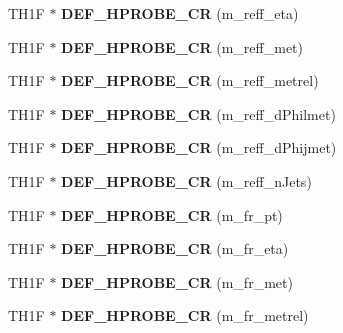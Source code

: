 \begin{DoxyCompactItemize}
\item 
\hypertarget{classHistos__Fake_a42e0ed3e92796cb4f5d49ed05856e556}{
TH1F $\ast$ {\bfseries DEF\_\-HPROBE\_\-CR} (m\_\-reff\_\-eta)}
\label{classHistos__Fake_a42e0ed3e92796cb4f5d49ed05856e556}

\item 
\hypertarget{classHistos__Fake_a049fd62ffe785865d7ad3dc3d92a0fd5}{
TH1F $\ast$ {\bfseries DEF\_\-HPROBE\_\-CR} (m\_\-reff\_\-met)}
\label{classHistos__Fake_a049fd62ffe785865d7ad3dc3d92a0fd5}

\item 
\hypertarget{classHistos__Fake_a22584688e38d9aa766ffbf6f2abe565c}{
TH1F $\ast$ {\bfseries DEF\_\-HPROBE\_\-CR} (m\_\-reff\_\-metrel)}
\label{classHistos__Fake_a22584688e38d9aa766ffbf6f2abe565c}

\item 
\hypertarget{classHistos__Fake_a62d8a373fdcf1ed317413d337f88c4a9}{
TH1F $\ast$ {\bfseries DEF\_\-HPROBE\_\-CR} (m\_\-reff\_\-dPhilmet)}
\label{classHistos__Fake_a62d8a373fdcf1ed317413d337f88c4a9}

\item 
\hypertarget{classHistos__Fake_a159625642f7b3d3f6bbaeffb6ecd9b51}{
TH1F $\ast$ {\bfseries DEF\_\-HPROBE\_\-CR} (m\_\-reff\_\-dPhijmet)}
\label{classHistos__Fake_a159625642f7b3d3f6bbaeffb6ecd9b51}

\item 
\hypertarget{classHistos__Fake_a47b44cbf3e686ed35b6f8e900b471894}{
TH1F $\ast$ {\bfseries DEF\_\-HPROBE\_\-CR} (m\_\-reff\_\-nJets)}
\label{classHistos__Fake_a47b44cbf3e686ed35b6f8e900b471894}

\item 
\hypertarget{classHistos__Fake_af393a3f24cc5b5456db2d2b99198b989}{
TH1F $\ast$ {\bfseries DEF\_\-HPROBE\_\-CR} (m\_\-fr\_\-pt)}
\label{classHistos__Fake_af393a3f24cc5b5456db2d2b99198b989}

\item 
\hypertarget{classHistos__Fake_a038f89a0e1bcf657f79b86d73cfc29e6}{
TH1F $\ast$ {\bfseries DEF\_\-HPROBE\_\-CR} (m\_\-fr\_\-eta)}
\label{classHistos__Fake_a038f89a0e1bcf657f79b86d73cfc29e6}

\item 
\hypertarget{classHistos__Fake_a7035f9e252790804835d7b4840b35a51}{
TH1F $\ast$ {\bfseries DEF\_\-HPROBE\_\-CR} (m\_\-fr\_\-met)}
\label{classHistos__Fake_a7035f9e252790804835d7b4840b35a51}

\item 
\hypertarget{classHistos__Fake_a179d98b23568f0c4db44a5dcfe91f89d}{
TH1F $\ast$ {\bfseries DEF\_\-HPROBE\_\-CR} (m\_\-fr\_\-metrel)}
\label{classHistos__Fake_a179d98b23568f0c4db44a5dcfe91f89d}


\end{DoxyCompactItemize}
